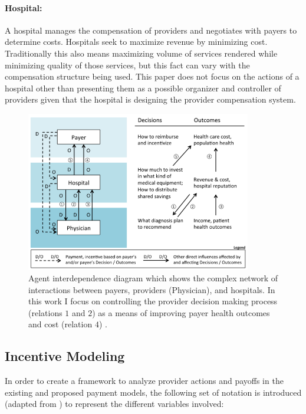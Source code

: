 \documentclass{article}
\begin{document}
\paragraph{Hospital:}A hospital manages the compensation of providers and negotiates with payers to determine costs. Hospitals seek to maximize revenue by minimizing cost. Traditionally this also means maximizing volume of services rendered while minimizing quality of those services, but this fact can vary with the compensation structure being used. This paper does not focus on the actions of a hospital other than presenting them as a possible organizer and controller of providers given that the hospital is designing the provider compensation system.

\begin{figure}[H]
\includegraphics[height=7cm]{agentdep}
\centering
\caption{Agent interdependence diagram which shows the complex network of interactions between payers, providers (Physician), and hospitals. In this work I focus on controlling the provider decision making process (relations $1$ and $2$) as a means of improving payer health outcomes and cost (relation $4$) \cite{msdt}.}
\label{fig:agentdep}
\end{figure}

\subsection{Incentive Modeling} \label{sec:modeling}
In order to create a framework to analyze provider actions and payoffs in the existing and proposed payment models, the following set of notation is introduced (adapted from \cite{trust}\cite{blended}) to represent the different variables involved:
\end{document}
